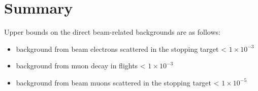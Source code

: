 \documentclass[12pt]{article}
\begin{document}
\newpage
\section{Summary}
Upper bounds on the direct beam-related backgrounds are as follows:
\begin{itemize}
\item
  background from beam electrons scattered in the stopping target < $1 \times 10^{-3}$
\item
  background from muon decay in flights < $1 \times 10^{-3}$
\item
  background from beam muons scattered in the stopping target < $1 \times 10^{-5}$
\end{itemize}
%
\newpage


\end{document}
